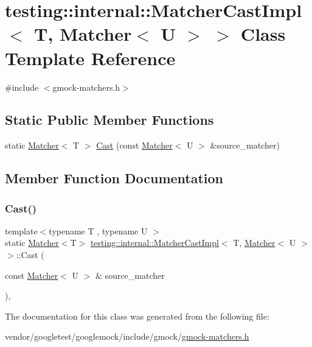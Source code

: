 \hypertarget{classtesting_1_1internal_1_1_matcher_cast_impl_3_01_t_00_01_matcher_3_01_u_01_4_01_4}{}\section{testing\+:\+:internal\+:\+:Matcher\+Cast\+Impl$<$ T, Matcher$<$ U $>$ $>$ Class Template Reference}
\label{classtesting_1_1internal_1_1_matcher_cast_impl_3_01_t_00_01_matcher_3_01_u_01_4_01_4}


{\ttfamily \#include $<$gmock-\/matchers.\+h$>$}

\subsection*{Static Public Member Functions}
\begin{DoxyCompactItemize}
\item 
static \hyperlink{classtesting_1_1_matcher}{Matcher}$<$ T $>$ \hyperlink{classtesting_1_1internal_1_1_matcher_cast_impl_3_01_t_00_01_matcher_3_01_u_01_4_01_4_a913a41264cc05c1fd261ee0cf1ede6fe}{Cast} (const \hyperlink{classtesting_1_1_matcher}{Matcher}$<$ U $>$ \&source\+\_\+matcher)
\end{DoxyCompactItemize}


\subsection{Member Function Documentation}
\mbox{\label{classtesting_1_1internal_1_1_matcher_cast_impl_3_01_t_00_01_matcher_3_01_u_01_4_01_4_a913a41264cc05c1fd261ee0cf1ede6fe}} 
\subsubsection{\texorpdfstring{Cast()}{Cast()}}
{\footnotesize\ttfamily template$<$typename T , typename U $>$ \\
static \hyperlink{classtesting_1_1_matcher}{Matcher}$<$T$>$ \hyperlink{classtesting_1_1internal_1_1_matcher_cast_impl}{testing\+::internal\+::\+Matcher\+Cast\+Impl}$<$ T, \hyperlink{classtesting_1_1_matcher}{Matcher}$<$ U $>$ $>$\+::Cast (\begin{DoxyParamCaption}\item[{const \hyperlink{classtesting_1_1_matcher}{Matcher}$<$ U $>$ \&}]{source\+\_\+matcher }\end{DoxyParamCaption})\hspace{0.3cm}{\ttfamily [inline]}, {\ttfamily [static]}}



The documentation for this class was generated from the following file\+:\begin{DoxyCompactItemize}
\item 
vendor/googletest/googlemock/include/gmock/\hyperlink{gmock-matchers_8h}{gmock-\/matchers.\+h}\end{DoxyCompactItemize}
